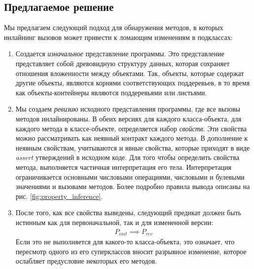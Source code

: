\subsection{Предлагаемое решение}
\label{impl:unjustified_algo}
Мы предлагаем следующий подход для обнаружения методов, в которых инлайнинг вызовов может привести к ломающим изменениям в подклассах:
\begin{enumerate}
    \item Создается \textit{изначальное} представление программы. Это представление представляет собой древовидную структуру данных, которая сохраняет отношения вложенности между объектами. Так, объекты, которые содержат другие объекты, являются корнями соответствующих поддеревьев, в то время как объекты-контейнеры являются поддеревьями или листьями.
    \item Мы создаем \textit{ревизию} исходного представления программы, где все вызовы методов инлайнированы.
    В обеих версиях для каждого класса-объекта, для каждого метода в классе-объекте, определяется набор \textit{свойств}.  Эти свойства можно рассматривать как неявный контракт \cite{meyer} каждого метода. В дополнение к неявным свойствам, учитываются и явные свойства, которые приходят в виде \textit{assert} утверждений в исходном коде. Для того чтобы определить свойства метода, выполняется частичная интерпретация его тела. Интерпретация ограничивается основными числовыми операциями, числовыми и булевыми значениями и вызовами методов. Более подробно правила вывода описаны на рис. \ref{fig:property_inference}.
    \item После того, как все свойства выведены, следующий предикат должен быть истинным как для первоначальной, так и для измененной версии:
          \begin{align}
              P_{init} \implies P_{rev}
              \label{fig:implication}
          \end{align}
          Если это не выполняется для какого-то класса-объекта, это означает, что пересмотр одного из его суперклассов вносит разрывное изменение, которое ослабляет предусловие некоторых его методов.
\end{enumerate}

